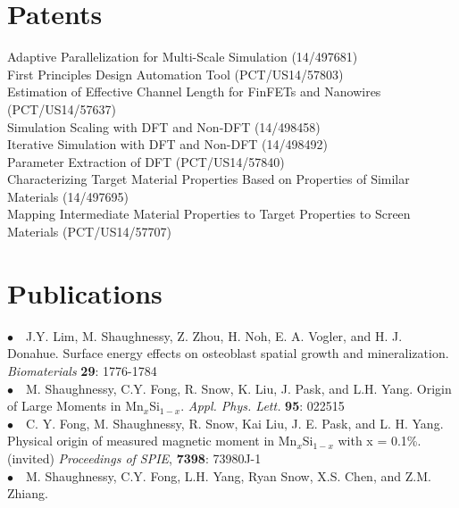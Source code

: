 \documentclass[11pt, a4paper]{article}
\newcommand{\years}[1]{\marginnote{\scriptsize #1}}
\begin{document}
{\section*{{\color{mycolor4}\textbf{Patents}}}
\noindent
Adaptive Parallelization for Multi-Scale Simulation (14/497681) \\
First Principles Design Automation Tool (PCT/US14/57803) \\
Estimation of Effective Channel Length for FinFETs and Nanowires (PCT/US14/57637) \\
Simulation Scaling with DFT and Non-DFT (14/498458) \\
Iterative Simulation with DFT and Non-DFT (14/498492) \\
Parameter Extraction of DFT (PCT/US14/57840) \\
Characterizing Target Material Properties Based on Properties of Similar Materials (14/497695) \\
Mapping Intermediate Material Properties to Target Properties to Screen Materials (PCT/US14/57707)\\




\section*{{\color{mycolor4}\textbf{Publications}}}
\noindent
\years{2008}$\bullet$\ \   J.Y. Lim, M. Shaughnessy, Z. Zhou, H. Noh, E. A. Vogler, and H. J. Donahue.  %
{Surface energy effects on osteoblast spatial growth and mineralization.} \emph{Biomaterials} \textbf{29}: 1776-1784\\  
\years{2009}$\bullet$\ \   M. Shaughnessy, C.Y. Fong, R. Snow, K. Liu, J. Pask, and L.H. Yang. %
{ Origin of Large Moments in Mn$_x$Si$_{1-x}$.}\emph { Appl. Phys. Lett.} \textbf{95}: 022515\\
\years{    }$\bullet$\ \   C. Y. Fong, M. Shaughnessy, R. Snow, Kai Liu, J. E. Pask, and L. H. Yang. %
{Physical origin of measured magnetic moment in Mn$_x$Si$_{1-x}$ with x = 0.1\%.} (invited) \emph{Proceedings of SPIE}, \textbf{7398}: 73980J-1\\
\years{2010}$\bullet$\ \   M. Shaughnessy, C.Y. Fong, L.H. Yang, Ryan Snow, X.S. Chen, and Z.M. Zhiang. %

}
\end{document}
